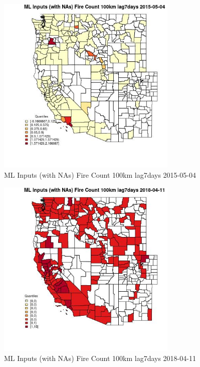 \begin{figure} 
\centering  
\includegraphics[width=0.77\textwidth]{Code_Outputs/Report_ML_input_PM25_Step4_part_e_de_duplicated_aves_compiled_2019-05-18wNAs_CountyFire_Count_100km_lag7daysMean2015-05-04_2015-05-04.jpg} 
\caption{\label{fig:Report_ML_input_PM25_Step4_part_e_de_duplicated_aves_compiled_2019-05-18wNAsCountyFire_Count_100km_lag7daysMean2015-05-04_2015-05-04}ML Inputs (with NAs) Fire Count 100km lag7days 2015-05-04} 
\end{figure} 
 

\clearpage 

\begin{figure} 
\centering  
\includegraphics[width=0.77\textwidth]{Code_Outputs/Report_ML_input_PM25_Step4_part_e_de_duplicated_aves_compiled_2019-05-18wNAs_CountyFire_Count_100km_lag7daysMean2018-04-11_2018-04-11.jpg} 
\caption{\label{fig:Report_ML_input_PM25_Step4_part_e_de_duplicated_aves_compiled_2019-05-18wNAsCountyFire_Count_100km_lag7daysMean2018-04-11_2018-04-11}ML Inputs (with NAs) Fire Count 100km lag7days 2018-04-11} 
\end{figure} 
 

